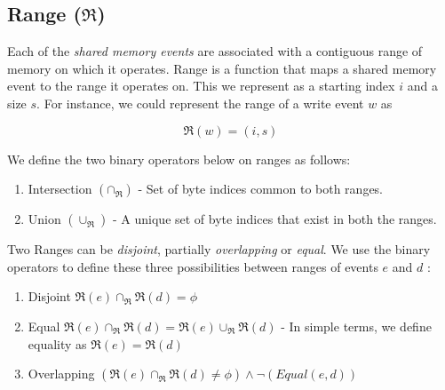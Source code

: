     \subsection{Range ($\Re$)}
        Each of the \textit{shared memory events} are associated with a contiguous range of memory on which it operates. 
        Range is a function that maps a shared memory event to the range it operates on\footnotemark. 
        This we represent as a starting index $i$ and a size $s$. 
        For instance, we could represent the range of a write event $w$ as 
                
                \[\Re(w) = (i, s) \]
    
        
        We define the two binary operators below on ranges as follows:
        \begin{enumerate}
            \item Intersection $(\cap{_\Re})$ - Set of byte indices common to both ranges.
            \item Union $(\cup_\Re)$ - A unique set of byte indices that exist in both the ranges.  
        \end{enumerate}
        
        Two Ranges can be \textit{disjoint}, partially \textit{overlapping} or \textit{equal}. 
        We use the binary operators to define these three possibilities between ranges of events $e$ and $d$ :
        \begin{enumerate}
            \item Disjoint $\Re(e) \cap_\Re \Re(d) = \phi$ 
            \item Equal $\Re(e) \cap_\Re  \Re(d) = \Re(e) \cup_\Re \Re(d)$ - In simple terms, we define equality as $\Re(e) = \Re(d)$
            \item Overlapping $(\Re(e)\cap_\Re \Re(d) \neq \phi) \wedge \neg(Equal(e,d))$    
        \end{enumerate}
            
    
